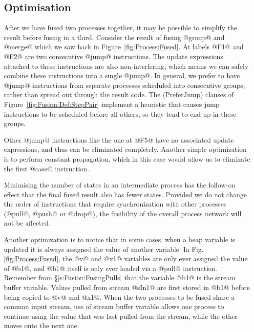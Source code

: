 \subsection{Optimisation}
\label{s:Optimisation}
After we have fused two processes together, it may be possible to simplify the result before fusing in a third. Consider the result of fusing @group@ and @merge@ which we saw back in Figure~\ref{fig:Process:Fused}. At labels @F1@ and @F2@ are two consecutive @jump@ instructions.
The update expressions attached to these instructions are also non-interfering, which means we can safely combine these instructions into a single @jump@.
In general, we prefer to have @jump@ instructions from separate processes scheduled into consecutive groups, rather than spread out through the result code.
The (PreferJump) clauses of Figure~\ref{fig:Fusion:Def:StepPair} implement a heuristic that causes jump instructions to be scheduled before all others, so they tend to end up in these groups.

Other @jump@ instructions like the one at @F5@ have no associated update expressions, and thus can be eliminated completely. Another simple optimization is to perform constant propagation, which in this case would allow us to eliminate the first @case@ instruction. 

Minimising the number of states in an intermediate process has the follow-on effect that the final fused result also has fewer states. Provided we do not change the order of instructions that require synchronization with other processes (@pull@, @push@ or @drop@), the fusibility of the overall process network will not be affected.

Another optimization is to notice that in some cases, when a heap variable is updated it is always assigned the value of another variable. In Fig.\ref{fig:Process:Fused}, the @v@ and @x1@ variables are only ever assigned the value of @b1@, and @b1@ itself is only ever loaded via a @pull@ instruction. Remember from \S\ref{s:Fusion:FusingPulls} that the variable @b1@ is the stream buffer variable. Values pulled from stream @sIn1@ are first stored in @b1@ before being copied to @v@ and @x1@. When the two processes to be fused share a common input stream, use of stream buffer variable allows one process to continue using the value that was last pulled from the stream, while the other moves onto the next one. 


